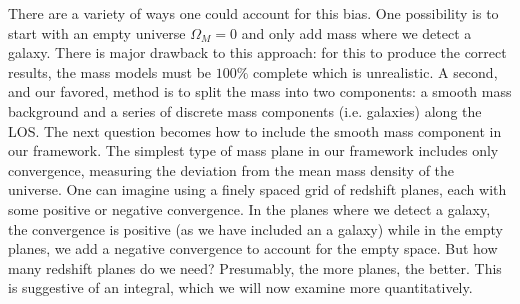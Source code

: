 There are a variety of ways one could account for this bias. One possibility is to start with an empty universe $\Omega_M = 0$ and only add mass where we detect a galaxy. There is major drawback to this approach: for this to produce the correct results, the mass models must be $100\%$ complete which is unrealistic. A second, and our favored, method is to split the mass into two components: a smooth mass background and a series of discrete mass components (i.e. galaxies) along the LOS. The next question becomes how to include the smooth mass component in our framework. The simplest type of mass plane in our framework includes only convergence, measuring the deviation from the mean mass density of the universe. One can imagine using a finely spaced grid of redshift planes, each with some positive or negative convergence. In the planes where we detect a galaxy, the convergence is positive (as we have included an a galaxy) while in the empty planes, we add a negative convergence to account for the empty space. But how many redshift planes do we need? Presumably, the more planes, the better. This is suggestive of an integral, which we will now examine more quantitatively.
  
  